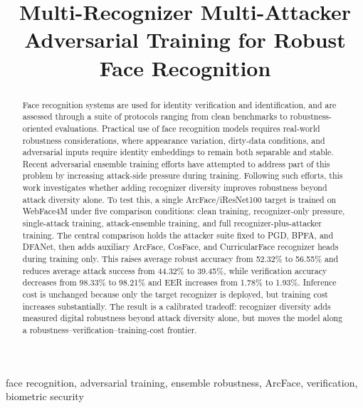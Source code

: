 \documentclass[conference]{IEEEtran}
\begin{document}
\title{Multi-Recognizer Multi-Attacker Adversarial Training for Robust Face Recognition}

\author{
}

\maketitle

\begin{abstract}
Face recognition systems are used for identity verification and identification, 
and are assessed through a suite of protocols ranging from clean benchmarks to 
robustness-oriented evaluations. Practical use of face recognition models 
requires real-world robustness considerations, where appearance variation, dirty-data 
conditions, and adversarial inputs require identity embeddings to remain both 
separable and stable. Recent adversarial ensemble training efforts have attempted 
to address part of this problem by increasing attack-side pressure during training. 
Following such efforts, this work investigates whether adding recognizer diversity 
improves robustness beyond attack diversity alone. To test this, a single ArcFace/iResNet100 target is trained on WebFace4M 
under five comparison conditions: clean training, recognizer-only pressure, single-attack 
training, attack-ensemble training, and full recognizer-plus-attacker training. The 
central comparison holds the attacker suite fixed to PGD, BPFA, and DFANet, then adds 
auxiliary ArcFace, CosFace, and CurricularFace recognizer heads during training only. 
This raises average robust accuracy from 52.32\% to 56.55\% and reduces average attack 
success from 44.32\% to 39.45\%, while verification accuracy decreases from 98.33\% to 
98.21\% and EER increases from 1.78\% to 1.93\%. Inference cost is unchanged because only 
the target recognizer is deployed, but training cost increases substantially. The result 
is a calibrated tradeoff: recognizer diversity adds measured digital robustness beyond 
attack diversity alone, but moves the model along a robustness–verification–training-cost 
frontier.
\end{abstract}

\begin{IEEEkeywords}
face recognition, adversarial training, ensemble robustness, ArcFace,
verification, biometric security
\end{IEEEkeywords}
\end{document}
